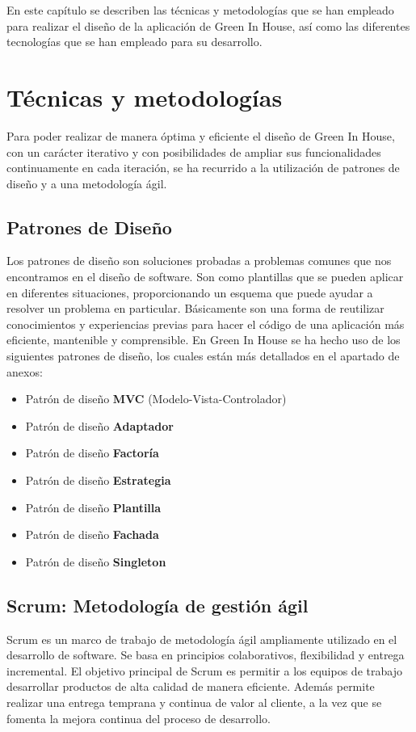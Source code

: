 En este capítulo se describen las técnicas y metodologías que se han empleado para realizar el diseño de la aplicación de Green In House, así como las diferentes tecnologías que se han empleado para su desarrollo.

\section{Técnicas y metodologías}
Para poder realizar de manera óptima y eficiente el diseño de Green In House, con un carácter iterativo y con posibilidades de ampliar sus funcionalidades continuamente en cada iteración, se ha recurrido a la utilización de patrones de diseño y a una metodología ágil. 

    \subsection{Patrones de Diseño}
    Los patrones de diseño \cite{wiki:patrones_de_diseño} son soluciones probadas a problemas comunes que nos encontramos en el diseño de software. Son como plantillas que se pueden aplicar en diferentes situaciones, proporcionando un esquema que puede ayudar a resolver un problema en particular. Básicamente son una forma de reutilizar conocimientos y experiencias previas para hacer el código de una aplicación más eficiente, mantenible y comprensible.
    En Green In House se ha hecho uso de los siguientes patrones de diseño, los cuales están más detallados en el apartado de anexos:
    \begin{itemize}                
        \item Patrón de diseño \textbf{MVC} (Modelo-Vista-Controlador)
        \item Patrón de diseño \textbf{Adaptador}
        \item Patrón de diseño \textbf{Factoría}
        \item Patrón de diseño \textbf{Estrategia}
        \item Patrón de diseño \textbf{Plantilla}
        \item Patrón de diseño \textbf{Fachada}
        \item Patrón de diseño \textbf{Singleton}
    \end{itemize} 

    \subsection{Scrum: Metodología de gestión ágil}
    Scrum \cite{wiki:scrum} es un marco de trabajo de metodología ágil ampliamente utilizado en el desarrollo de software. Se basa en principios colaborativos, flexibilidad y entrega incremental. El objetivo principal de Scrum es permitir a los equipos de trabajo desarrollar productos de alta calidad de manera eficiente. Además permite realizar una entrega temprana y continua de valor al cliente, a la vez que se fomenta la mejora continua del proceso de desarrollo.
    
